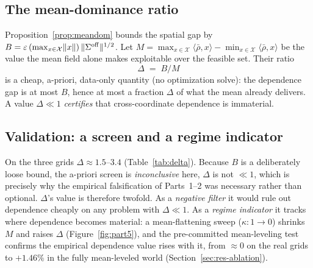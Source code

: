 \documentclass[12pt]{article}
\begin{document}
\subsection{The mean-dominance ratio}
Proposition~\ref{prop:meandom} bounds the spatial gap by
$B=\varepsilon\,(\max_{x\in\mathcal X}\lVert x\rVert)\,\lVert\Sigma^{\rm off}\rVert^{1/2}$.
Let $M=\max_{x\in\mathcal X}\langle\bar\rho,x\rangle-\min_{x\in\mathcal X}\langle\bar
\rho,x\rangle$ be the value the mean field alone makes exploitable over the feasible
set. Their ratio
\begin{equation}
\Delta \;=\; B / M
\label{eq:delta}
\end{equation}
is a cheap, a-priori, data-only quantity (no optimization solve): the dependence gap is
at most $B$, hence at most a fraction $\Delta$ of what the mean already delivers. A
value $\Delta\ll1$ \emph{certifies} that cross-coordinate dependence is immaterial.

\subsection{Validation: a screen and a regime indicator}
On the three grids $\Delta\approx1.5$--$3.4$ (Table~\ref{tab:delta}). Because $B$ is a
deliberately loose bound, the a-priori screen is \emph{inconclusive} here, $\Delta$ is
not $\ll1$, which is precisely why the empirical falsification of Parts~1--2 was
necessary rather than optional. $\Delta$'s value is therefore twofold. As a
\emph{negative filter} it would rule out dependence cheaply on any problem with
$\Delta\ll1$. As a \emph{regime indicator} it tracks where dependence becomes
material: a mean-flattening sweep ($\kappa:1\!\to\!0$) shrinks $M$ and raises $\Delta$
(Figure~\ref{fig:part5}), and the pre-committed mean-leveling test confirms the empirical
dependence value rises with it, from $\approx0$ on the real grids to $+1.46\%$ in the
fully mean-leveled world (Section~\ref{sec:res-ablation}).
\end{document}
